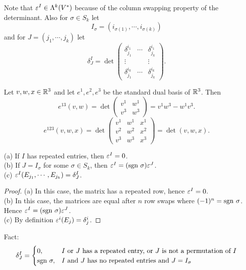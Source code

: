 Note that $\varepsilon^I \in \Lambda^k(V^*)$ because of the column swapping property of the determinant. Also for $\sigma \in S_k$ let 
$$I_\sigma = (i_{\sigma(1)},\cdots,i_{\sigma(k)})$$ and for $J = (j_1,\cdots, j_k)$ let 
$$\delta_J^I = \det  \begin{pmatrix}
\delta_{j_1}^{i_1} & \cdots & \delta_{j_k}^{i_1} \\
\vdots & & \vdots \\
\delta_{j_1}^{i_k} & \cdots & \delta_{j_k}^{i_k}
\end{pmatrix}.$$
\begin{example}
    Let $v,w,x \in \mathbb{R}^3$ and let $e^1,e^2,e^3$ be the standard dual basis of $\mathbb{R}^3$. Then 
    $$e^{13}(v,w) = \det \begin{pmatrix}
        v^1 & w^1 \\
        v^3 & w^3
    \end{pmatrix} = v^1 w^3 - w^1 v^3. $$
    $$e^{123}(v,w,x) = \det \begin{pmatrix}
        v^1 & w^1 & x^1 \\
        v^2 & w^2 & x^2 \\
        v^3 & w^3 & x^3 
    \end{pmatrix} = \det (v,w,x). $$
\end{example}
\begin{lemma}\label{14.7}
    (a) If $I$ has repeated entries, then $\varepsilon^I = 0$. \\
    (b) If $J = I_\sigma$ for some $\sigma \in S_k$, then $\varepsilon^I = (\mathrm{sgn~} \sigma) \varepsilon^J$. \\
    (c) $\varepsilon^I(E_{j_1},\cdots,E_{j_k}) = \delta_J^I$.
\end{lemma}
\begin{proof}
    (a) In this case, the matrix has a repeated row, hence $\varepsilon^I = 0$. \\
    (b) In this case, the matrices are equal after $n$ row swaps where $(-1)^n = \mathrm{sgn~} \sigma$. Hence $\varepsilon^I = (\mathrm{sgn~} \sigma) \varepsilon^J$. \\
    (c) By definition $\varepsilon^i(E_j) = \delta_j^i$.
\end{proof}
\begin{remark}
Fact: $$\delta_J^I = \begin{cases}
0, & I \text{ or } J \text{ has a repeated entry, or }J\text{ is not a permutation of }I \\
\mathrm{sgn~} \sigma, & I \text{ and } J \text{ has no repeated entries and }J=I_\sigma
\end{cases}$$
\end{remark}
